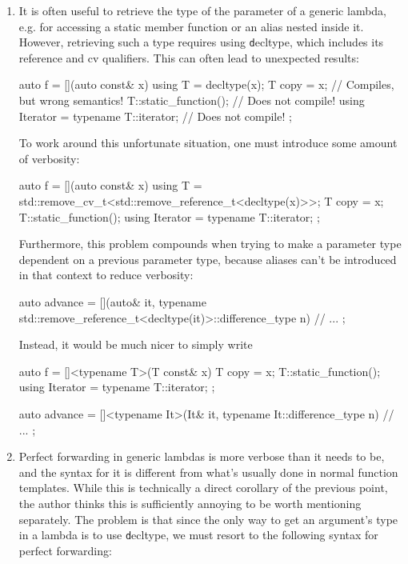 \documentclass[11pt]{article}
\newcommand{\cc}[1]{\texttt{#1}}
\begin{document}
\begin{enumerate}
\item
It is often useful to retrieve the type of the parameter of a generic
lambda, e.g. for accessing a static member function or an alias nested
inside it. However, retrieving such a type requires using \cc decltype,
which includes its reference and cv qualifiers. This can often lead to
unexpected results:

\begin{cpp}
auto f = [](auto const& x) {
  using T = decltype(x);
  T copy = x;                             // Compiles, but wrong semantics!
  T::static_function();                   // Does not compile!
  using Iterator = typename T::iterator;  // Does not compile!
};
\end{cpp}

To work around this unfortunate situation, one must introduce some
amount of verbosity:

\begin{cpp}
auto f = [](auto const& x) {
  using T = std::remove_cv_t<std::remove_reference_t<decltype(x)>>;
  T copy = x;
  T::static_function();
  using Iterator = typename T::iterator;
};
\end{cpp}

Furthermore, this problem compounds when trying to make a parameter type
dependent on a previous parameter type, because aliases can't be introduced
in that context to reduce verbosity:

\begin{cpp}
auto advance = [](auto& it,
                  typename std::remove_reference_t<decltype(it)>::difference_type n) {
  // ...
};
\end{cpp}

Instead, it would be much nicer to simply write

\begin{cpp}
auto f = []<typename T>(T const& x) {
  T copy = x;
  T::static_function();
  using Iterator = typename T::iterator;
};

auto advance = []<typename It>(It& it, typename It::difference_type n) {
  // ...
};
\end{cpp}


\item
Perfect forwarding in generic lambdas is more verbose than it needs to
be, and the syntax for it is different from what's usually done in normal
function templates. While this is technically a direct corollary of the
previous point, the author thinks this is sufficiently annoying to be
worth mentioning separately. The problem is that since the only way to
get an argument's type in a lambda is to use \cc decltype, we must resort
to the following syntax for perfect forwarding:


\end{enumerate}
\end{document}
